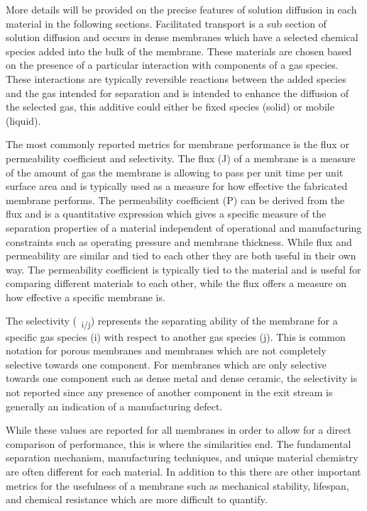 More details will be provided on the precise features of solution diffusion in each material in the following 
sections. Facilitated transport is a sub section of solution diffusion and occurs in dense membranes which 
have a selected chemical species added into the bulk of the membrane. These materials are chosen based on the 
presence of a particular interaction with components of a gas species. These interactions are typically 
reversible reactions between the added species and the gas intended for separation and is intended to enhance 
the diffusion of the selected gas, this additive could either be fixed species (solid) or mobile (liquid). 

The most commonly reported metrics for membrane performance is the flux or permeability coefficient and 
selectivity. The flux (J) of a membrane is a measure of the amount of gas the membrane is allowing to pass 
per unit time per unit surface area and is typically used as a measure for how effective the fabricated 
membrane performs. The permeability coefficient (P) can be derived from the flux and is a quantitative 
expression which gives a specific measure of the separation properties of a material independent of 
operational and manufacturing constraints such as operating pressure and membrane thickness. 
While flux and permeability are similar and tied to each other they are both useful in their own way. 
The permeability coefficient is typically tied to the material and is useful for comparing different 
materials to each other, while the flux offers a measure on how effective a specific membrane is. 

The selectivity (\textalpha \ \textsubscript{i/j}) represents the separating ability of the membrane for a specific gas species 
(i) with respect to another gas species (j). This is common notation for porous membranes and membranes which 
are not completely selective towards one component. For membranes which are only selective towards one 
component such as dense metal and dense ceramic, the selectivity is not reported since any presence of 
another component in the exit stream is generally an indication of a manufacturing defect. 

While these values are reported for all membranes in order to allow for a direct comparison of 
performance, this is where the similarities end. The fundamental separation mechanism, manufacturing 
techniques, and unique material chemistry are often different for each material. In addition to this 
there are other important metrics for the usefulness of a membrane such as mechanical stability, lifespan, 
and chemical resistance which are more difficult to quantify. 

